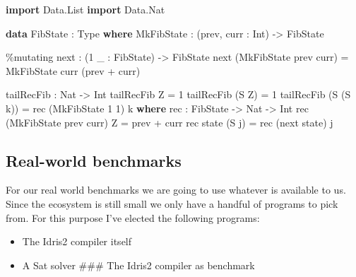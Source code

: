 \documentclass[
]{article}
\newenvironment{Shaded}{}{}
\newcommand{\DataTypeTok}[1]{\textcolor[rgb]{0.56,0.13,0.00}{#1}}
\newcommand{\DecValTok}[1]{\textcolor[rgb]{0.25,0.63,0.44}{#1}}
\newcommand{\KeywordTok}[1]{\textcolor[rgb]{0.00,0.44,0.13}{\textbf{#1}}}
\newcommand{\NormalTok}[1]{#1}
\newcommand{\OperatorTok}[1]{\textcolor[rgb]{0.40,0.40,0.40}{#1}}
\newcommand{\OtherTok}[1]{\textcolor[rgb]{0.00,0.44,0.13}{#1}}
\providecommand{\tightlist}{%
  \setlength{\itemsep}{0pt}\setlength{\parskip}{0pt}}
\begin{document}
\begin{Shaded}
\begin{Highlighting}[]
\KeywordTok{import} \DataTypeTok{Data.List}
\KeywordTok{import} \DataTypeTok{Data.Nat}

\KeywordTok{data} \DataTypeTok{FibState} \OperatorTok{:} \DataTypeTok{Type} \KeywordTok{where}
  \DataTypeTok{MkFibState} \OperatorTok{:}\NormalTok{ (prev, curr }\OperatorTok{:}  \DataTypeTok{Int}\NormalTok{) }\OtherTok{{-}\textgreater{}} \DataTypeTok{FibState}

\OperatorTok{\%}\NormalTok{mutating}
\NormalTok{next }\OperatorTok{:}\NormalTok{ (}\DecValTok{1}\NormalTok{ \_ }\OperatorTok{:} \DataTypeTok{FibState}\NormalTok{) }\OtherTok{{-}\textgreater{}} \DataTypeTok{FibState}
\NormalTok{next (}\DataTypeTok{MkFibState}\NormalTok{ prev curr) }\OtherTok{=} \DataTypeTok{MkFibState}\NormalTok{ curr (prev }\OperatorTok{+}\NormalTok{ curr)}


\NormalTok{tailRecFib }\OperatorTok{:} \DataTypeTok{Nat} \OtherTok{{-}\textgreater{}} \DataTypeTok{Int}
\NormalTok{tailRecFib }\DataTypeTok{Z} \OtherTok{=} \DecValTok{1}
\NormalTok{tailRecFib (}\DataTypeTok{S} \DataTypeTok{Z}\NormalTok{) }\OtherTok{=} \DecValTok{1}
\NormalTok{tailRecFib (}\DataTypeTok{S}\NormalTok{ (}\DataTypeTok{S}\NormalTok{ k)) }\OtherTok{=}\NormalTok{ rec (}\DataTypeTok{MkFibState} \DecValTok{1} \DecValTok{1}\NormalTok{) k}
  \KeywordTok{where}
\NormalTok{    rec }\OperatorTok{:} \DataTypeTok{FibState} \OtherTok{{-}\textgreater{}} \DataTypeTok{Nat} \OtherTok{{-}\textgreater{}} \DataTypeTok{Int}
\NormalTok{    rec (}\DataTypeTok{MkFibState}\NormalTok{ prev curr) }\DataTypeTok{Z} \OtherTok{=}\NormalTok{ prev }\OperatorTok{+}\NormalTok{ curr}
\NormalTok{    rec state (}\DataTypeTok{S}\NormalTok{ j) }\OtherTok{=}\NormalTok{ rec (next state) j}
\end{Highlighting}
\end{Shaded}

\hypertarget{real-world-benchmarks}{%
\subsection{Real-world benchmarks}\label{real-world-benchmarks}}

For our real world benchmarks we are going to use whatever is available
to us. Since the ecosystem is still small we only have a handful of
programs to pick from. For this purpose I've elected the following
programs:

\begin{itemize}
\tightlist
\item
  The Idris2 compiler itself
\item
  A Sat solver \#\#\# The Idris2 compiler as benchmark
\end{itemize}
\end{document}
